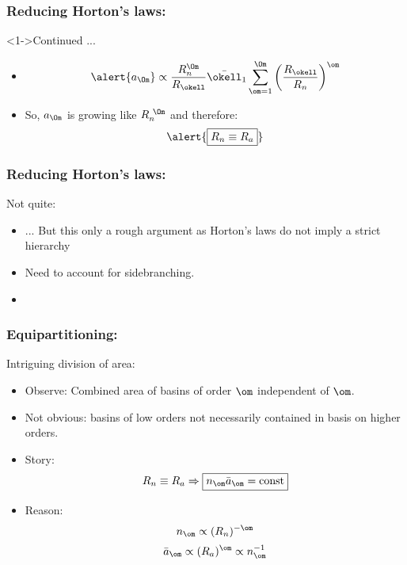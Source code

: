 \begin{frame}[label=]
  \frametitle{Reducing Horton's laws:}

  \begin{block}<1->{Continued ...}
    \begin{itemize}
    \item<1->
      $$
      \alert{a_\Om} \propto \frac{R_n^\Om}{R_\okell} \bar{\okell}_1
      \sum_{\om=1}^{\Om} 
       \left(
         \frac{R_\okell}{R_n}
       \right)^\om
      $$
    \item<4->{
        So, $a_\Om$ is growing like $R_n^{\ \Om}$ and therefore:
        $$
        \alert{\boxed{R_n \equiv R_a}}
        $$
      }
    \end{itemize}
  \end{block}

\end{frame}

\begin{frame}[label=]
  \frametitle{Reducing Horton's laws:}

  \begin{block}{Not quite:}
    \begin{itemize}
    \item<1-> ... But this only a rough argument
      as Horton's laws do not imply a strict hierarchy
    \item<2-> Need to account for sidebranching.
    \item<3-> 
    \end{itemize}
  \end{block}

\end{frame}

\begin{frame}[label=]
  \frametitle{Equipartitioning:}

  \begin{block}{Intriguing division of area:}
  \begin{itemize}
  \item<1->
    Observe: Combined area of basins of order $\om$ 
    independent of $\om$.
  \item<2->
    Not obvious: basins of low orders not necessarily contained
    in basis on higher orders.
  \item<3->
    Story: $$ {R_n \equiv R_a} 
    \Rightarrow \boxed{n_\om \bar{a}_\om = \mbox{const}} $$
  \item<4->
    Reason:
    $$ n_\om \propto (R_n)^{-\om} $$
    $$ \bar{a}_\om \propto (R_a)^{\om} \propto n_\om^{-1}$$
  \end{itemize}
  \end{block}

\end{frame}

